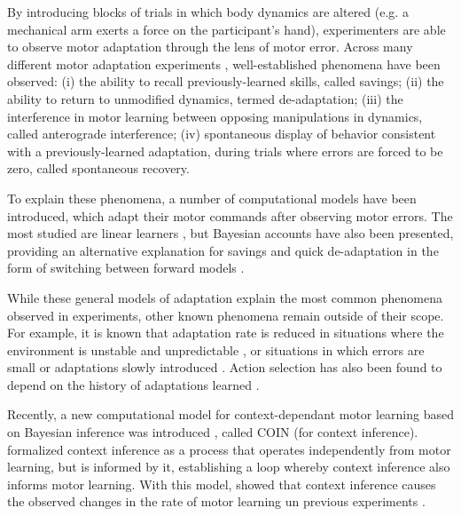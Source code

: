 \documentclass[a4paper,doc,floatsintext,natbib]{apa6}
\begin{document}
By introducing blocks of trials in which body dynamics are altered (e.g. a mechanical arm exerts a force on the participant's hand), experimenters are able to observe motor adaptation through the lens of motor error. Across many different motor adaptation experiments \citep[e.g.][]{Gandolfo_Motor_1996,Shadmehr_Adaptive_1994,Davidson_Scaling_2004}, well-established phenomena have been observed: (i) the ability to recall previously-learned skills, called savings; (ii) the ability to return to unmodified dynamics, termed de-adaptation; (iii) the interference in motor learning between opposing manipulations in dynamics, called anterograde interference; (iv) spontaneous display of behavior consistent with a previously-learned adaptation, during trials where errors are forced to be zero, called spontaneous recovery.

To explain these phenomena, a number of computational models have been introduced, which adapt their motor commands after observing motor errors. The most studied are linear learners \citep{Smith_Interacting_2006,Forano_Timescales_2020,Scheidt_Learning_2001}, but Bayesian accounts have also been presented, providing an alternative explanation for savings and quick de-adaptation in the form of switching between forward models \citep{Kording_Bayesian_2004,Oh_Minimizing_2019}.

While these general models of adaptation explain the most common phenomena observed in experiments, other known phenomena remain outside of their scope. For example, it is known that adaptation rate is reduced in situations where the environment is unstable and unpredictable \citep{Herzfeld_memory_2014}, or situations in which errors are small \citep{Marko_Sensitivity_2012} or adaptations slowly introduced \citep{Huang_Persistence_2009}. Action selection has also been found to depend on the history of adaptations learned \citep{Vaswani_Decay_2013,Davidson_Scaling_2004}.

Recently, a new computational model for context-dependant motor learning based on Bayesian inference was introduced \cite{Heald_Contextual_2021}, called COIN (for context inference). \cite{Heald_Contextual_2021} formalized context inference as a process that operates independently from motor learning, but is informed by it, establishing a loop whereby context inference also informs motor learning. With this model, \cite{Heald_Contextual_2021} showed that context inference causes the observed changes in the rate of motor learning un previous experiments \cite[e.g.][]{Herzfeld_Encoding_2018}.
\end{document}
